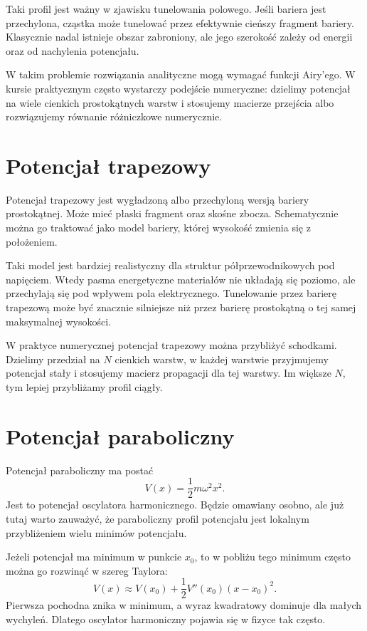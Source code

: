Taki profil jest ważny w zjawisku tunelowania polowego. Jeśli bariera jest przechylona, cząstka może tunelować przez efektywnie cieńszy fragment bariery. Klasycznie nadal istnieje obszar zabroniony, ale jego szerokość zależy od energii oraz od nachylenia potencjału.

W takim problemie rozwiązania analityczne mogą wymagać funkcji Airy'ego. W kursie praktycznym często wystarczy podejście numeryczne: dzielimy potencjał na wiele cienkich prostokątnych warstw i stosujemy macierze przejścia albo rozwiązujemy równanie różniczkowe numerycznie.

\section{Potencjał trapezowy}

Potencjał trapezowy jest wygładzoną albo przechyloną wersją bariery prostokątnej. Może mieć płaski fragment oraz skośne zbocza. Schematycznie można go traktować jako model bariery, której wysokość zmienia się z położeniem.

Taki model jest bardziej realistyczny dla struktur półprzewodnikowych pod napięciem. Wtedy pasma energetyczne materiałów nie układają się poziomo, ale przechylają się pod wpływem pola elektrycznego. Tunelowanie przez barierę trapezową może być znacznie silniejsze niż przez barierę prostokątną o tej samej maksymalnej wysokości.

W praktyce numerycznej potencjał trapezowy można przybliżyć schodkami. Dzielimy przedział na \(N\) cienkich warstw, w każdej warstwie przyjmujemy potencjał stały i stosujemy macierz propagacji dla tej warstwy. Im większe \(N\), tym lepiej przybliżamy profil ciągły.

\section{Potencjał paraboliczny}

Potencjał paraboliczny ma postać
\begin{equation}
    V(x)=\frac{1}{2}m\omega^2x^2.
\end{equation}
Jest to potencjał oscylatora harmonicznego. Będzie omawiany osobno, ale już tutaj warto zauważyć, że paraboliczny profil potencjału jest lokalnym przybliżeniem wielu minimów potencjału.

Jeżeli potencjał ma minimum w punkcie \(x_0\), to w pobliżu tego minimum często można go rozwinąć w szereg Taylora:
\begin{equation}
    V(x)\approx V(x_0)+\frac{1}{2}V''(x_0)(x-x_0)^2.
\end{equation}
Pierwsza pochodna znika w minimum, a wyraz kwadratowy dominuje dla małych wychyleń. Dlatego oscylator harmoniczny pojawia się w fizyce tak często.

